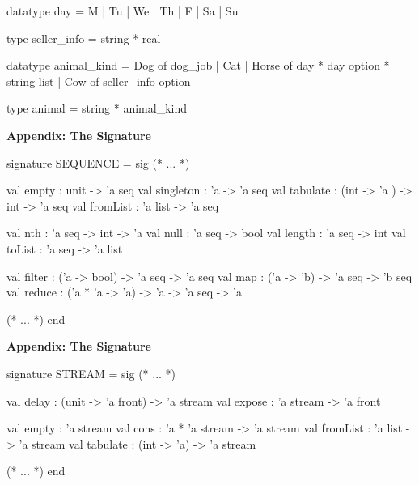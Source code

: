 \documentclass[addpoints,12pt]{exam}
\begin{document}
\begin{questions}
\begin{parts}
\begin{solutionorbox}[35em]
\begin{codeblock}
        datatype day = M | Tu | We | Th | F | Sa | Su

        type seller_info = string * real

        datatype animal_kind =
            Dog of dog_job
          | Cat
          | Horse of day * day option * string list
          | Cow of seller_info option

        type animal = string * animal_kind
      \end{codeblock}
    \end{solutionorbox}
\end{parts}

\newpage

\textbf{Appendix: The  Signature}

\begin{codeblock}
  signature SEQUENCE =
    sig
      (* ... *)

      val empty : unit -> 'a seq
      val singleton : 'a -> 'a seq
      val tabulate : (int -> 'a ) -> int -> 'a seq
      val fromList : 'a list -> 'a seq

      val nth : 'a seq -> int -> 'a
      val null : 'a seq -> bool
      val length : 'a seq -> int
      val toList : 'a seq -> 'a list

      val filter : ('a -> bool) -> 'a seq -> 'a seq
      val map : ('a -> 'b) -> 'a seq -> 'b seq
      val reduce : ('a * 'a -> 'a) -> 'a -> 'a seq -> 'a

      (* ... *)
    end
\end{codeblock}

\vspace{20pt}

\textbf{Appendix: The  Signature}

\begin{codeblock}
signature STREAM =
  sig
    (* ... *)

    val delay : (unit -> 'a front) -> 'a stream
    val expose : 'a stream -> 'a front

    val empty : 'a stream
    val cons : 'a * 'a stream -> 'a stream
    val fromList : 'a list -> 'a stream
    val tabulate : (int -> 'a) -> 'a stream

    (* ... *)
  end
\end{codeblock}




\end{questions}
\end{document}
